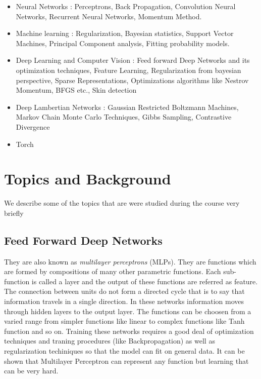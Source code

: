\documentclass{article}
\begin{document}
\begin{itemize}
\item Neural Networks \cite{Newnet, dlbook, cnnufldl} : Perceptrons, Back Propagation, Convolution Neural Networks, Recurrent Neural Networks, Momentum Method.
\item Machine learning \cite{dlbook, mlcourse, cvmli}: Regularization, Bayesian statistics, Support Vector Machines, Principal Component analysis, Fitting probability models.
\item Deep Learning and Computer Vision \cite{dlbook, cvmli, cilvr}:	Feed forward Deep Networks and its optimization techniques, Feature Learning, Regularization from bayesian perspective, Sparse Representations, Optimizations algorithms like Nestrov Momentum, BFGS etc., Skin detection
\item Deep Lambertian Networks \cite{dln, rbm, rbmdl}: Gaussian Restricted Boltzmann Machines, Markov Chain Monte Carlo Techniques, Gibbs Sampling, Contrastive Divergence
\item Torch \cite{torch, torg}
\end{itemize}


\section{Topics and Background}
We describe some of the topics that are were studied during the course very briefly

\subsection{Feed Forward Deep Networks}
They are also known as \textit{multilayer perceptrons }(MLPs). They are functions which are formed by compositions of many other parametric functions. Each sub-function is called a layer and the output of these functions are referred as feature. The connection between units do not form a directed cycle that is to say that information travels in a single direction. In these networks information moves through hidden layers to the output layer. The functions can be choosen from a varied range from simpler functions like linear to complex functions like Tanh function and so on. Training these networks requires a good deal of optimization techniques and traning procedures (like Backpropagation) as well as regularization techiniques so that the model can fit on general data. It can be shown that Multilayer Perceptron can represent any function but learning that can be very hard.
\end{document}
